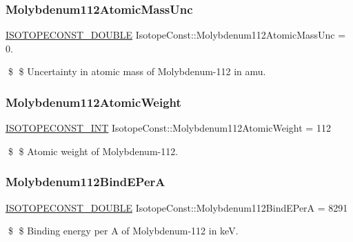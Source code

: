 \subsubsection{\texorpdfstring{Molybdenum112\+Atomic\+Mass\+Unc}{Molybdenum112AtomicMassUnc}}
{\footnotesize\ttfamily \mbox{\hyperlink{group___isotope_const-_macros_ga8f45a7272ce02c0b4c65c44636ed719a}{I\+S\+O\+T\+O\+P\+E\+C\+O\+N\+S\+T\+\_\+\+D\+O\+U\+B\+LE}} Isotope\+Const\+::\+Molybdenum112\+Atomic\+Mass\+Unc = 0.}

\$ \$ Uncertainty in atomic mass of Molybdenum-\/112 in amu. \mbox{\label{group___isotope_const-_molybdenum-_mo112_ga64045e0258c73c0d315f91cacb78ed57}} 
\subsubsection{\texorpdfstring{Molybdenum112\+Atomic\+Weight}{Molybdenum112AtomicWeight}}
{\footnotesize\ttfamily \mbox{\hyperlink{group___isotope_const-_macros_ga5f18360b3e99483a35c32d789e62621c}{I\+S\+O\+T\+O\+P\+E\+C\+O\+N\+S\+T\+\_\+\+I\+NT}} Isotope\+Const\+::\+Molybdenum112\+Atomic\+Weight = 112}

\$ \$ Atomic weight of Molybdenum-\/112. \mbox{\label{group___isotope_const-_molybdenum-_mo112_ga671c20afe9e73bebfdb7e2018c023f44}} 
\subsubsection{\texorpdfstring{Molybdenum112\+Bind\+E\+PerA}{Molybdenum112BindEPerA}}
{\footnotesize\ttfamily \mbox{\hyperlink{group___isotope_const-_macros_ga8f45a7272ce02c0b4c65c44636ed719a}{I\+S\+O\+T\+O\+P\+E\+C\+O\+N\+S\+T\+\_\+\+D\+O\+U\+B\+LE}} Isotope\+Const\+::\+Molybdenum112\+Bind\+E\+PerA = 8291}

\$ \$ Binding energy per A of Molybdenum-\/112 in keV. \mbox{\label{group___isotope_const-_molybdenum-_mo112_gad7e0bcb37214ae7344ce176f4bb3b68d}} 
